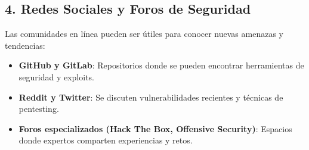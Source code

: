 \subsection{4. Redes Sociales y Foros de Seguridad}
Las comunidades en línea pueden ser útiles para conocer nuevas amenazas y tendencias:
\begin{itemize}
    \item \textbf{GitHub y GitLab}: Repositorios donde se pueden encontrar herramientas de seguridad y exploits.
    \item \textbf{Reddit y Twitter}: Se discuten vulnerabilidades recientes y técnicas de pentesting.
    \item \textbf{Foros especializados (Hack The Box, Offensive Security)}: Espacios donde expertos comparten experiencias y retos.
\end{itemize}   